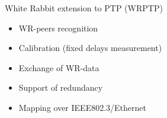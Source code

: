 \documentclass[compress,red]{beamer}
\begin{document}
\begin{frame}{White Rabbit extension to PTP (WRPTP)}

  \begin{itemize}
    \item WR-peers recognition
    \item Calibration (fixed delays measurement)
    \item Exchange of WR-data
    \item Support of redundancy
    \item Mapping over IEEE802.3/Ethernet
  \end{itemize}

\end{frame}
\end{document}
